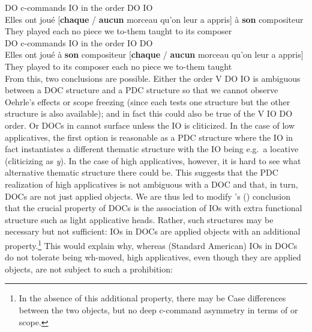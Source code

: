 \documentclass[output=paper]{langsci/langscibook}
\begin{document}
\ea \label{doio26}
\ea  DO c-commands IO in the order DO IO\\
\gll Elles ont  jou\'{e} [{\bf chaque} / {\bf aucun} morceau qu'on leur a appris] \`{a} {\bf son} compositeur\\
They {} played  each {} no piece we to-them {} taught to its composer\\
\ex  DO c-commands IO in the order IO DO\\
\gll Elles  ont jou\'{e}  \`{a} {\bf son} compositeur [\textbf{chaque} / \textbf{aucun} morceau qu'on leur a appris]\\
They {} played   to its composer each {} no piece we to-them {} taught\\
\z
\z
%
From this, two conclusions are possible. Either the order V DO IO is ambiguous
between a \gls{DOC} structure and a
\gls{PDC} structure so that we cannot
observe Oehrle's effects or scope freezing (since each tests one structure but
the other structure is also available); and in fact this could also be true of
the V IO DO order. Or \glspl{DOC} in
 cannot surface unless the IO is cliticized. In the case of low
applicatives, the first option is reasonable as a \gls{PDC} structure where the IO in fact instantiates a different
thematic structure with the IO being e.g.\ a locative (cliticizing as {\it y}).
In the case of high applicatives, however, it is hard to see what alternative
thematic structure there could be. This suggests that the
\gls{PDC} realization of high
applicatives is not ambiguous with a \gls{DOC}
and that, in turn, \glspl{DOC} are not just applied objects. We are thus led to
modify \citeauthor{anagnostopoulou2005cross}'s
(\citeyear{anagnostopoulou2005cross}) conclusion that the crucial  property of
\glspl{DOC} is  the association of \glspl{IO}
with extra functional structure such  as light applicative heads. Rather, such
structures may be necessary but not sufficient: \glspl{IO} in \glspl{DOC} are
applied objects with an additional property.\footnote{In the absence of this
    additional property, there may be Case differences between the two objects,
    but no deep c-command asymmetry in terms of  or scope.} This
    would explain why, whereas (Standard American)  \glspl{IO} in
    \glspl{DOC} do not tolerate being wh-moved, high applicatives, even though
    they are applied objects, are not subject to such a prohibition:
\end{document}
